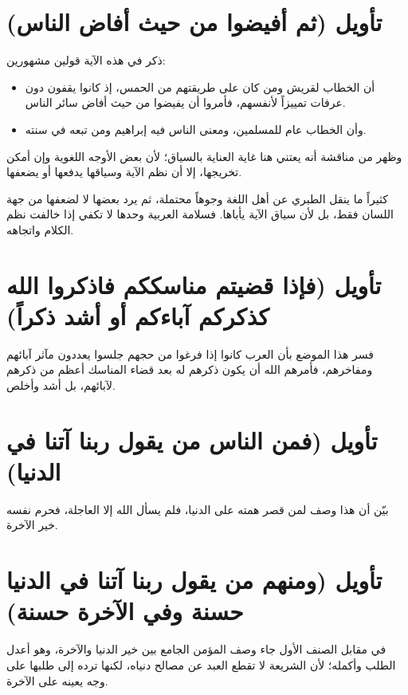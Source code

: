 \separator

\section{تأويل (ثم أفيضوا من حيث أفاض الناس)}
ذكر  في هذه الآية قولين مشهورين:
\begin{itemize}
    \item أن الخطاب لقريش ومن كان على طريقتهم من الحمس، إذ كانوا يقفون دون عرفات تمييزاً لأنفسهم، فأمروا أن يفيضوا من حيث أفاض سائر الناس.
    \item وأن الخطاب عام للمسلمين، ومعنى الناس فيه إبراهيم ومن تبعه في سنته.
\end{itemize}

وظهر من مناقشة  أنه يعتني هنا غاية العناية بالسياق؛ لأن بعض الأوجه اللغوية وإن أمكن تخريجها، إلا أن نظم الآية وسياقها يدفعها أو يضعفها.

\begin{fawaid}
كثيراً ما ينقل الطبري عن أهل اللغة وجوهاً محتملة، ثم يرد بعضها لا لضعفها من جهة اللسان فقط، بل لأن سياق الآية يأباها. فسلامة العربية وحدها لا تكفي إذا خالفت نظم الكلام واتجاهه.
\end{fawaid}

\section{تأويل (فإذا قضيتم مناسككم فاذكروا الله كذكركم آباءكم أو أشد ذكراً)}
فسر  هذا الموضع بأن العرب كانوا إذا فرغوا من حجهم جلسوا يعددون مآثر آبائهم ومفاخرهم، فأمرهم الله أن يكون ذكرهم له بعد قضاء المناسك أعظم من ذكرهم لآبائهم، بل أشد وأخلص.

\section{تأويل (فمن الناس من يقول ربنا آتنا في الدنيا)}
بيّن  أن هذا وصف لمن قصر همته على الدنيا، فلم يسأل الله إلا العاجلة، فحرم نفسه خير الآخرة.

\section{تأويل (ومنهم من يقول ربنا آتنا في الدنيا حسنة وفي الآخرة حسنة)}
في مقابل الصنف الأول جاء وصف المؤمن الجامع بين خير الدنيا والآخرة، وهو أعدل الطلب وأكمله؛ لأن الشريعة لا تقطع العبد عن مصالح دنياه، لكنها ترده إلى طلبها على وجه يعينه على الآخرة.

\separator

